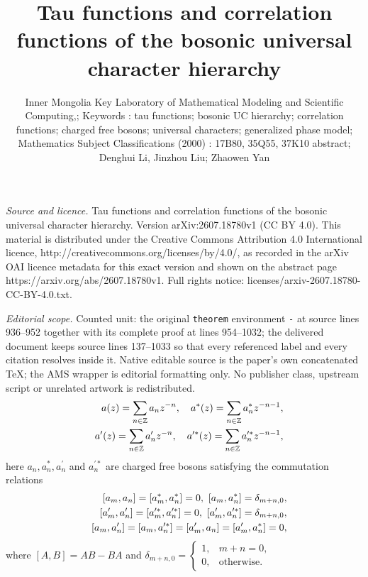 \documentclass[10pt,a4paper]{amsart}
\numberwithin{equation}{section}
\begin{document}
\title[Tau functions and correlation functions of the bosonic unive]{Tau functions and correlation functions of the bosonic universal character hierarchy}
\author{Inner Mongolia Key Laboratory of Mathematical Modeling and Scientific Computing,; Keywords : tau functions; bosonic UC hierarchy; correlation functions; charged free bosons; universal characters; generalized phase model; Mathematics Subject Classifications (2000) : 17B80, 35Q55, 37K10 abstract; Denghui Li, Jinzhou Liu; Zhaowen Yan}
\date{}
\maketitle
\noindent\emph{Source and licence.} Tau functions and correlation functions of the bosonic universal character hierarchy. Version arXiv:2607.18780v1 (CC BY 4.0). This material is distributed under the Creative Commons Attribution 4.0 International licence, http://creativecommons.org/licenses/by/4.0/, as recorded in the arXiv OAI licence metadata for this exact version and shown on the abstract page https://arxiv.org/abs/2607.18780v1. Full rights notice: licenses/arxiv-2607.18780-CC-BY-4.0.txt.\par\smallskip
\noindent\textit{Editorial scope.} Counted unit: the original \texttt{theorem} environment \texttt{-} at source lines 936--952 together with its complete proof at lines 954--1032; the delivered document keeps source lines 137--1033 so that every referenced label and every citation resolves inside it. Native editable source is the paper's own concatenated TeX; the AMS wrapper is editorial formatting only. No publisher class, upstream script or unrelated artwork is redistributed.
\begin{eqnarray}\label{boson_generating_function}
&&a(z)=\sum\limits_{n\in\mathbb{Z}}a_{n}z^{-n},\quad a^{\ast}(z)=\sum\limits_{n\in\mathbb{Z}}a^{\ast}_{n}z^{-n-1},\notag\\
&&a^{\prime}(z)=\sum\limits_{n\in\mathbb{Z}}a^{\prime}_{n}z^{-n},\quad a^{\prime\ast}(z)=\sum\limits_{n\in\mathbb{Z}}a^{\prime\ast}_{n}z^{-n-1},
\end{eqnarray}
here $a_{n},a^{\ast}_{n},a^{\prime}_{n}$ and $a^{\prime\ast}_{n}$ are charged free bosons satisfying the  commutation relations
\begin{eqnarray}\label{boson_commutation}
&&[a_{m},a_{n}]=[a^{\ast}_{m},a^{\ast}_{n}]=0,\ [a_{m},a^{\ast}_{n}]=\delta_{m+n,0},\notag\\
&&[a^{\prime}_{m},a^{\prime}_{n}]=[a^{\prime\ast}_{m},a^{\prime\ast}_{n}]=0,\ [a^{\prime}_{m},a^{\prime\ast}_{n}]=\delta_{m+n,0},\notag\\
&&[a_{m},a^{\prime}_{n}]=[a_{m},a^{\prime\ast}_{n}]=[a^{\prime}_{m},a_{n}]
=[a^{\prime}_{m},a^{\ast}_{n}]=0,
\end{eqnarray}
where $[A,B]=AB-BA$ and $\delta_{m+n,0} = \begin{cases}
1, &m+n=0, \\
0, & \text{otherwise}.
\end{cases}$
\end{document}
